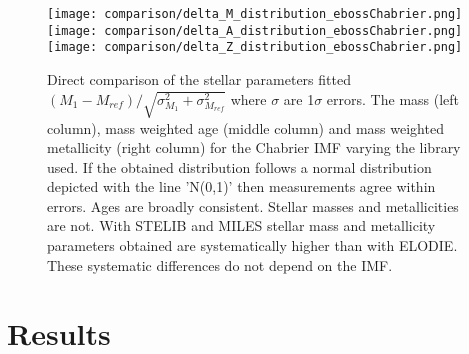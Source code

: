 \documentclass[onecolumn]{aa}
\begin{document}
\begin{figure*}
\begin{center}
\caption{\label{fig:comparison:library} 
Direct comparison of the stellar parameters fitted $(M_1-M_{ref})/\sqrt{\sigma^2_{M_1}+\sigma^2_{M_{ref}}}$ where $\sigma$ are 1$\sigma$ errors. The mass (left column), mass weighted age (middle column) and mass weighted metallicity (right column) for the Chabrier IMF varying the library used. 
If the obtained distribution follows a normal distribution depicted with the line 'N(0,1)' then measurements agree within errors. 
Ages are broadly consistent. 
Stellar masses and metallicities are not. 
With STELIB and MILES stellar mass and metallicity parameters obtained are systematically higher than with ELODIE. 
These systematic differences do not depend on the IMF.}  
\texttt{[image: comparison/delta\_M\_distribution\_ebossChabrier.png]}
\texttt{[image: comparison/delta\_A\_distribution\_ebossChabrier.png]}
\texttt{[image: comparison/delta\_Z\_distribution\_ebossChabrier.png]}

\end{center}
\end{figure*}





















\clearpage
\section{Results}
\label{sec:results}

\end{document}

